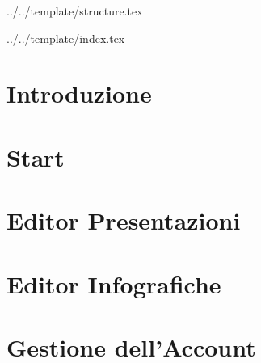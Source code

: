 

\def\DOCUMENTO{Manuale Utente}
\def\VERSIONE{1.0.0}

\def\DESCRIZIONE{Documento che facilita l'utilizzo dell'applicazione da parte dell'utente.}

\def\REDATTORE {Crespan Emanuele}
\def\VERIFICATORE {Agostinetto Matteo}
\def\RESPONSABILE {Suierica Bogdan}

\def\USO {Esterno}

\def\DISTRIBUZIONE {\GRUPPO{}\\ & \COMMITTENTE{}\\ & Piccoli Gregorio, \textit{Zucchetti spa}\\}


\def\INDICE	{true}
\def\TABELLE {true}
\def\FIGURE {true}


 {../../template/structure.tex}


 {../../template/index.tex}

\section{Introduzione}

\newpage
\section{Start}

\newpage
\section{Editor Presentazioni}

\newpage
\section{Editor Infografiche}

\newpage
\section{Gestione dell'Account}





